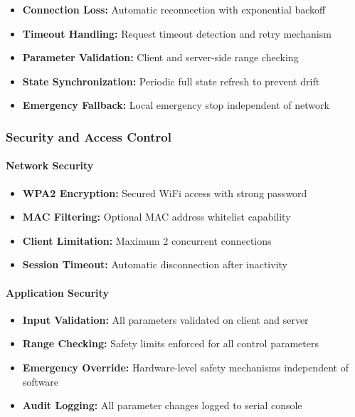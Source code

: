 \documentclass[12pt,a4paper]{article}
\begin{document}
\begin{itemize}
    \item \textbf{Connection Loss:} Automatic reconnection with exponential backoff
    \item \textbf{Timeout Handling:} Request timeout detection and retry mechanism
    \item \textbf{Parameter Validation:} Client and server-side range checking
    \item \textbf{State Synchronization:} Periodic full state refresh to prevent drift
    \item \textbf{Emergency Fallback:} Local emergency stop independent of network
\end{itemize}

\subsubsection{Security and Access Control}

\paragraph{Network Security}
\begin{itemize}
    \item \textbf{WPA2 Encryption:} Secured WiFi access with strong password
    \item \textbf{MAC Filtering:} Optional MAC address whitelist capability
    \item \textbf{Client Limitation:} Maximum 2 concurrent connections
    \item \textbf{Session Timeout:} Automatic disconnection after inactivity
\end{itemize}

\paragraph{Application Security}
\begin{itemize}
    \item \textbf{Input Validation:} All parameters validated on client and server
    \item \textbf{Range Checking:} Safety limits enforced for all control parameters
    \item \textbf{Emergency Override:} Hardware-level safety mechanisms independent of software
    \item \textbf{Audit Logging:} All parameter changes logged to serial console
\end{itemize}
\end{document}
